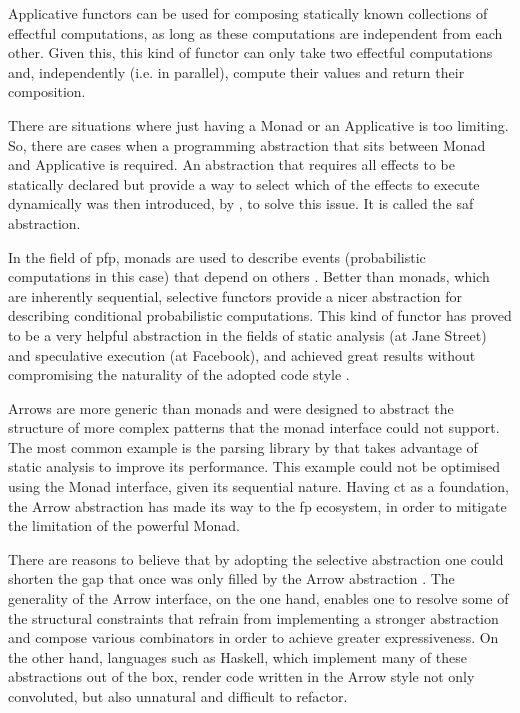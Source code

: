 \documentclass[
  oneside,
  11pt, a4paper,
  footinclude=true,
  headinclude=true,
  cleardoublepage=empty
]{scrbook}
\theoremstyle{definition}
\theoremstyle{definition}
\begin{document}
    Applicative functors \citep{mcbride2008applicative} can be used for composing statically known collections of effectful computations, as long as these computations are independent from each other. Given this, this kind of functor can only take two effectful computations and, independently (i.e. in parallel), compute their values and return their composition.

    There are situations where just having a Monad or an Applicative is too limiting. So, there are cases when a programming abstraction that sits between Monad and Applicative is required. An abstraction that requires all effects to be statically declared but provide a way to select which of the effects to execute dynamically was then introduced, by \cite{andrey2019selective}, to solve this issue. It is called the \gls{saf} abstraction.

    In the field of \gls{pfp}, monads are used to describe events (probabilistic computations in this case) that depend on others \citep{erwig_kollmansberger_2006}. Better than monads, which are inherently sequential, selective functors provide a nicer abstraction for describing conditional probabilistic computations. This kind of functor has proved to be a very helpful abstraction in the fields of static analysis (at Jane Street) and speculative execution (at Facebook), and achieved great results without compromising the naturality of the adopted code style \citep{andrey2019selective}.
    
    Arrows \citep{Hughes:2000:GMA:347238.347246} are more generic than monads and were designed to abstract the structure of more complex patterns that the monad interface could not support. The most common example is the parsing library by \cite{swiestra&duponcheel} that takes advantage of static analysis to improve its performance. This example could not be optimised using the Monad interface, given its sequential nature. Having \gls{ct} as a foundation, the Arrow abstraction has made its way to the \gls{fp} ecosystem, in order to mitigate the limitation of the powerful Monad.
    
    There are reasons to believe that by adopting the selective abstraction one could shorten the gap that once was only filled by the Arrow abstraction \citep{Hughes:2000:GMA:347238.347246}. The generality of the Arrow interface, on the one hand, enables one to resolve some of the structural constraints that refrain from implementing a stronger abstraction and compose various combinators in order to achieve greater expressiveness. On the other hand, languages such as Haskell, which implement many of these abstractions out of the box, render code written in the Arrow style not only convoluted, but also unnatural and difficult to refactor.
    
\end{document}
